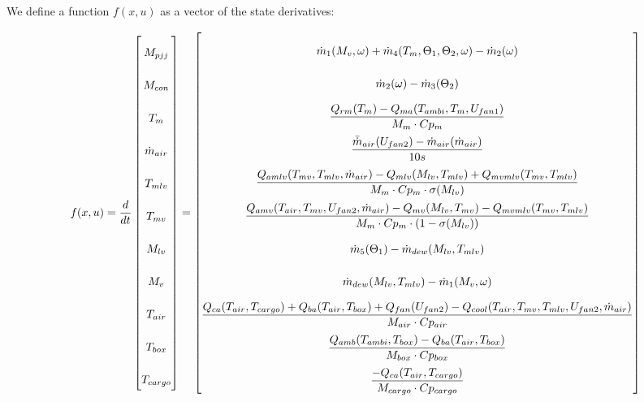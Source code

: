 We define a function $f(x,u)$ as a vector of the state derivatives:

\begin{equation} \label{eq:f_noSub} \renewcommand{\arraystretch}{2.4}
	f(x,u) =  \dfrac{d}{dt} \begin{bmatrix}
		M_{pjj}			\\				%
		M_{con} 		\\				%
		T_m 			\\				%
		\dot{m}_{air}	\\				%
		T_{mlv}			\\				%
		T_{mv}			\\				%
		M_{lv}			\\				%
		M_v				\\				%
		T_{air}			\\				%
		T_{box}			\\				%
		T_{cargo}		\\				%

	\end{bmatrix}
	=
	\begin{bmatrix}
		\dot{m}_1(M_{v}, \omega) + \dot{m}_4(T_m,\Theta_1,\Theta_2,\omega) - \dot{m}_2(\omega) \\										%
		\dot{m}_{2}(\omega) - \dot{m}_{3}(\Theta_2)	\\												%
		\dfrac{Q_{rm}(T_m) - Q_{ma}(T_{ambi}, T_m, U_{fan1})}{M_m \cdot Cp_m} \\									%
		\dfrac{\bar{\dot{m}}_{air}(U_{fan2})  - \dot{m}_{air}(\dot{m}_{air})} {10s}		\\					%
		\dfrac{Q_{amlv}(T_{mv},T_{mlv},\dot{m}_{air})-Q_{mlv}(M_{lv},T_{mlv}) + Q_{mvmlv}(T_{mv},T_{mlv})}{M_m \cdot Cp_m \cdot \sigma(M_{lv})}        \\	%
		\dfrac{Q_{amv}(T_{air},T_{mv},U_{fan2},\dot{m}_{air}) - Q_{mv}(M_{lv},T_{mv}) - Q_{mvmlv}(T_{mv},T_{mlv})}{M_m \cdot Cp_m \cdot (1- \sigma(M_{lv}))}	\\	%
		\dot{m}_{5}(\Theta_1) - \dot{m}_{dew}(M_{lv},T_{mlv})		\\											%
		\dot{m}_{dew}(M_{lv},T_{mlv}) - \dot{m}_1(M_{v}, \omega)	\\												%
		\dfrac{Q_{ca}(T_{air},T_{cargo}) + Q_{ba}(T_{air},T_{box}) + Q_{fan}(U_{fan2}) - Q_{cool}(T_{air},T_{mv},T_{mlv},U_{fan2},\dot{m}_{air})}{M_{air} \cdot Cp_{air}} \\		%
		\dfrac{Q_{amb}(T_{ambi},T_{box}) -  Q_{ba}(T_{air},T_{box})}{M_{box} \cdot Cp_{box}} \\							%
		\dfrac{-Q_{ca}(T_{air},T_{cargo})}{M_{cargo} \cdot Cp_{cargo}}									%
	\end{bmatrix}
\end{equation}

